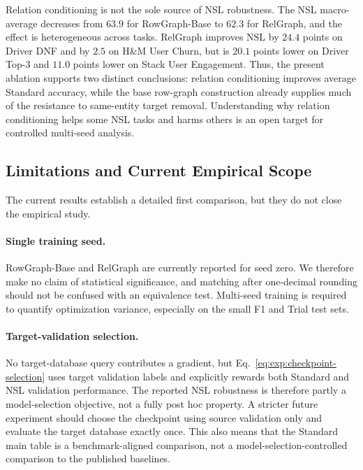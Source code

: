 Relation conditioning is not the sole source of NSL robustness. The NSL
macro-average decreases from \(63.9\) for RowGraph-Base to \(62.3\) for
RelGraph, and the effect is heterogeneous across tasks. RelGraph improves
NSL by \(24.4\) points on Driver DNF and by \(2.5\) on H\&M User Churn, but
is \(20.1\) points lower on Driver Top-3 and \(11.0\) points lower on Stack
User Engagement. Thus, the present ablation supports two distinct
conclusions: relation conditioning improves average Standard accuracy, while
the base row-graph construction already supplies much of the resistance to
same-entity target removal. Understanding why relation conditioning
helps some NSL tasks and harms others is an open target for controlled
multi-seed analysis.

\subsection{Limitations and Current Empirical Scope}
\label{sec:exp:limitations}

The current results establish a detailed first comparison, but they do not
close the empirical study.

\paragraph{Single training seed.}
RowGraph-Base and RelGraph are currently reported for seed zero. We
therefore make no claim of statistical significance, and matching after
one-decimal rounding should not be confused with an equivalence test.
Multi-seed training is required to quantify optimization variance,
especially on the small F1 and Trial test sets.

\paragraph{Target-validation selection.}
No target-database query contributes a gradient, but
Eq.~\eqref{eq:exp:checkpoint-selection} uses target validation labels and
explicitly rewards both Standard and NSL validation performance. The
reported NSL robustness is therefore partly a model-selection objective,
not a fully post hoc property. A stricter future experiment should choose
the checkpoint using source validation only and evaluate the target
database exactly once. This also means that the Standard main table is a
benchmark-aligned comparison, not a model-selection-controlled comparison
to the published baselines.

